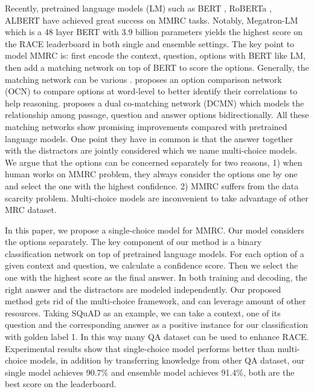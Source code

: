 \documentclass[11pt,a4paper]{article}
\begin{document}
Recently, pretrained language models (LM) such as BERT \cite{devlin2018bert}, RoBERTa \cite{liu2019roberta}, ALBERT \cite{lan2019albert} have achieved great success on MMRC tasks. Notably, Megatron-LM \cite{shoeybi2019megatron} which is a 48 layer BERT with 3.9 billion parameters yields the highest score on the RACE leaderboard in both single and ensemble settings. The key point to model MMRC is: first encode the context, question, options with BERT like LM, then add a matching network on top of BERT to score the options. Generally, the matching network can be various \cite{ran2019option, zhang2020dcmn, zhu2020duma}.  proposes an option comparison network (OCN) to compare options at word-level to better identify their correlations to help reasoning.  proposes a dual co-matching network (DCMN) which models the relationship among passage, question and answer options bidirectionally. All these matching networks show promising improvements compared with pretrained language models. One point they have in common is that the answer together with the distractors are jointly considered which we name multi-choice models. We argue that the options can be concerned separately for two reasons, 1) when human works on MMRC problem, they always consider the options one by one and select the one with the highest confidence. 2) MMRC suffers from the data scarcity problem. Multi-choice models are inconvenient to take advantage of other MRC dataset. 

In this paper, we propose a single-choice model for MMRC. Our model considers the options separately. The key component of our method is a binary classification network on top of pretrained language models. For each option of a given context and question, we calculate a confidence score. Then we select the one with the highest score as the final answer. In both training and decoding, the right answer and the distractors are modeled independently. Our proposed method gets rid of the multi-choice framework, and can leverage amount of other resources. Taking SQuAD as an example, we can take a context, one of its question and the corresponding answer as a positive instance for our classification with golden label 1. In this way many QA dataset can be used to enhance RACE. Experimental results show that single-choice model performs better than multi-choice models, in addition by transferring knowledge from other QA dataset, our single model achieves 90.7\% and ensemble model achieves 91.4\%, both are the best score on the leaderboard. 
\end{document}
